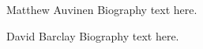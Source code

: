 \documentclass[12pt,journal,onecolumn]{IEEEtran}
\begin{document}
\begin{IEEEbiography}{Matthew Auvinen}
Biography text here.
\end{IEEEbiography}
\begin{IEEEbiography}{David Barclay}
Biography text here.
\end{IEEEbiography}

















 



\end{document}
